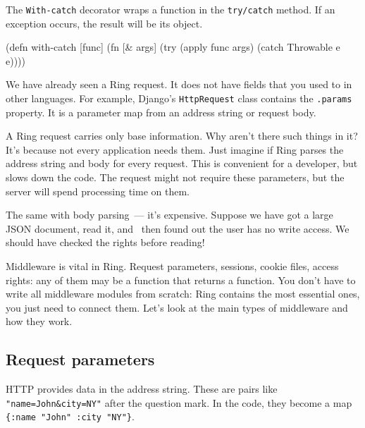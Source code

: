 
The \verb|With-catch| decorator wraps a function in the \verb|try/catch| method. If an exception occurs, the result will be its object.

\begin{english}
  \begin{clojure}
(defn with-catch [func]
  (fn [& args]
    (try
      (apply func args)
      (catch Throwable e
        e))))
  \end{clojure}
\end{english}


We have already seen a Ring request. It does not have fields that you used to in other languages. For example, Django's \verb|HttpRequest| class contains the \verb|.params| property. It is a parameter map from an address string or request body.

A Ring request carries only base information. Why aren't there such things in it? It's because not every application needs them. Just imagine if Ring parses the address string and body for every request. This is convenient for a developer, but slows down the code. The request might not require these parameters, but the server will spend processing time on them.

The same with body parsing~--- it's expensive. Suppose we have got a large JSON document, read it, and  then found out the user has no write access. We should have checked the rights before reading!

Middleware is vital in Ring. Request parameters, sessions, cookie files, access rights: any of them may be a function that returns a function. You don't have to write all middleware modules from scratch: Ring contains the most essential ones, you just need to connect them. Let's look at the main types of middleware and how they work.

\subsection{Request parameters}

\label{ring-params}


HTTP provides data in the address string. These are pairs like \verb|"name=John&city=NY"| after the question mark. In the code, they become a map \verb|{:name "John" :city "NY"}|.

